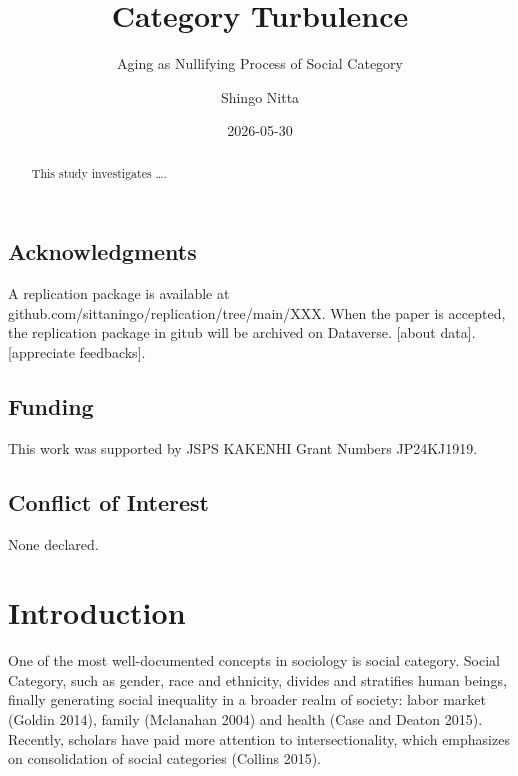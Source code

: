 \documentclass[
  letterpaper,
  DIV=11,
  numbers=noendperiod]{scrartcl}
\title{Category Turbulence}
\subtitle{Aging as Nullifying Process of Social Category}
\author{Shingo Nitta}
\date{2026-05-30}
\theoremstyle{paper}
\begin{document}
\maketitle
\begin{abstract}
This study investigates \ldots.
\end{abstract}
\ifdefined\Shaded\renewenvironment{Shaded}{\begin{tcolorbox}[borderline west={3pt}{0pt}{shadecolor}, breakable, interior hidden, sharp corners, enhanced, boxrule=0pt, frame hidden]}{\end{tcolorbox}}\fi

\hypertarget{acknowledgments}{%
\subsection{Acknowledgments}\label{acknowledgments}}

A replication package is available at
github.com/sittaningo/replication/tree/main/XXX. When the paper is
accepted, the replication package in gitub will be archived on
Dataverse. {[}about data{]}. {[}appreciate feedbacks{]}.

\hypertarget{funding}{%
\subsection{Funding}\label{funding}}

This work was supported by JSPS KAKENHI Grant Numbers JP24KJ1919.

\hypertarget{conflict-of-interest}{%
\subsection{Conflict of Interest}\label{conflict-of-interest}}

None declared.

\hypertarget{introduction}{%
\section{Introduction}\label{introduction}}

One of the most well-documented concepts in sociology is social
category. Social Category, such as gender, race and ethnicity, divides
and stratifies human beings, finally generating social inequality in a
broader realm of society: labor market (Goldin 2014), family (Mclanahan
2004) and health (Case and Deaton 2015). Recently, scholars have paid
more attention to intersectionality, which emphasizes on consolidation
of social categories (Collins 2015).
\end{document}
